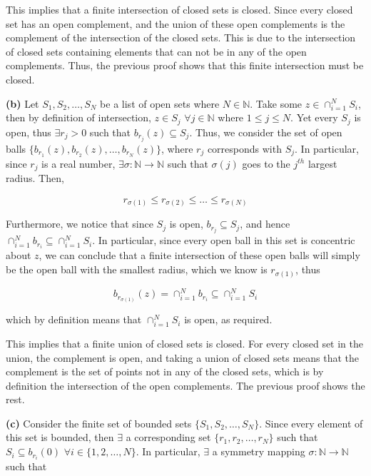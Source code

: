 \documentclass[10pt]{article}
\newcommand{\N}{\mathbb{N}}
\begin{document}
This implies that a finite intersection of closed sets is closed. Since every closed set has an open complement, and the union of these open complements is the complement of the intersection of the closed sets. This is due to the intersection of closed sets containing elements that can not be in any of the open complements. Thus, the previous proof shows that this finite intersection must be closed.

\textbf{(b)}
Let $S_{1}, S_{2}, \dots, S_{N}$ be a list of open sets where $N \in \N$. Take some $z\in \cap_{i=1}^{N}S_{i}$, then by definition of intersection, $z\in S_{j}$ $\forall j\in \N$ where $ 1\leq j \leq N$. Yet every $S_{j}$ is open, thus $\exists r_{j} > 0$ such that $b_{r_{j}}(z) \subseteq S_{j}$. Thus, we consider the set of open balls $\{ b_{r_{1}}(z) , b_{r_{2}}(z) , \dots , b_{r_{N}}(z) \}$, where $r_{j}$ corresponds with $S_{j}$. In particular, since $r_{j}$ is a real number, $\exists \sigma : \N \to \N$ such that $\sigma(j)$ goes to the $j^{th}$ largest radius. Then,

$$r_{\sigma(1)} \leq r_{\sigma(2)} \leq \dots \leq r_{\sigma(N)}$$

Furthermore, we notice that since $S_{j}$ is open, $b_{r_{j}} \subseteq S_{j}$, and hence $\cap_{i=1}^{N}b_{r_{i}} \subseteq \cap_{i=1}^{N} S_{i}$. In particular, since every open ball in this set is concentric about $z$, we can conclude that a finite intersection of these open balls will simply be the open ball with the smallest radius, which we know is $r_{\sigma(1)}$, thus

$$b_{r_{\sigma(1)}}(z) = \cap_{i=1}^{N}b_{r_{i}} \subseteq \cap_{i=1}^{N} S_{i}$$

which by definition means that $\cap_{i=1}^{N} S_{i}$ is open, as required.

This implies that a finite union of closed sets is closed. For every closed set in the union, the complement is open, and taking a union of closed sets means that the complement is the set of points not in any of the closed sets, which is by definition the intersection of the open complements. The previous proof shows the rest.

\textbf{(c)}
Consider the finite set of bounded sets $\{S_{1}, S_{2}, \dots , S_{N} \}$. Since every element of this set is bounded, then $\exists$ a corresponding set $\{r_{1} , r_{2}, \dots , r_{N} \}$ such that $S_{i} \subseteq b_{r_{i}}(0)$ $\forall i \in \{1, 2, \dots, N\}$. In particular, $\exists$ a symmetry mapping $\sigma: \N \to \N$ such that
\end{document}
